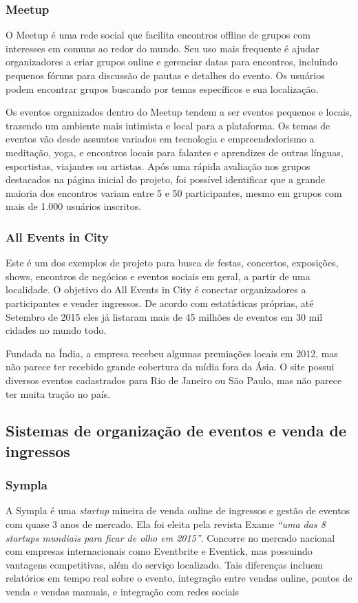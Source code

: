 \documentclass[12pt,a4paper,twoside,hyphens,english,brazil]{abntex2}
\begin{document}
\subsubsection*{Meetup}\label{sec:meetup}
O Meetup é uma rede social que facilita encontros offline de grupos com interesses em comuns ao redor do mundo. Seu uso mais frequente é ajudar organizadores a criar grupos online e gerenciar datas para encontros, incluindo pequenos fóruns para discussão de pautas e detalhes do evento. Os usuários podem encontrar grupos buscando por temas específicos e sua localização.

Os eventos organizados dentro do Meetup tendem a ser eventos pequenos e locais, trazendo um ambiente mais intimista e local para a plataforma. Os temas de eventos vão desde assuntos variados em tecnologia e empreendedorismo a meditação, yoga, e encontros locais para falantes e aprendizes de outras línguas, esportistas, viajantes ou artistas. Após uma rápida avaliação nos grupos destacados na página inicial do projeto, foi possível identificar que a grande maioria dos encontros variam entre 5 e 50 participantes, mesmo em grupos com mais de 1.000 usuários inscritos.

\subsubsection*{All Events in City}
Este é um dos exemplos de projeto para busca de festas, concertos, exposições, shows, encontros de negócios e eventos sociais em geral, a partir de uma localidade. O objetivo do All Events in City é conectar organizadores a participantes e vender ingressos. De acordo com estatísticas próprias, até Setembro de 2015 eles já listaram mais de 45 milhões de eventos em 30 mil cidades no mundo todo\cite{alleventsincity-wikipedia}.

Fundada na Índia, a empresa recebeu algumas premiações locais em 2012, mas não parece ter recebido grande cobertura da mídia fora da Ásia. O site possui diversos eventos cadastrados para Rio de Janeiro ou São Paulo, mas não parece ter muita tração no país.

\subsection{Sistemas de organização de eventos e venda de ingressos} \label{sec:concorrencia:venda}

\subsubsection*{Sympla}
A Sympla é uma \emph{startup} mineira de venda online de ingressos e gestão de eventos com quase 3 anos de mercado. Ela foi eleita pela revista Exame \emph{``uma das 8 startups mundiais para ficar de olho em 2015''}\cite{exame-8-startups}. Concorre no mercado nacional com empresas internacionais como Eventbrite e Eventick, mas possuindo vantagens competitivas, além do serviço localizado. Tais diferenças incluem relatórios em tempo real sobre o evento, integração entre vendas online, pontos de venda e vendas manuais, e integração com redes sociais
\end{document}

